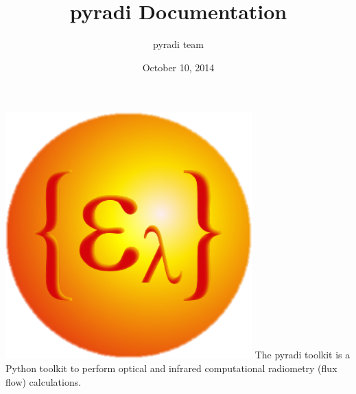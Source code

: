 \documentclass[a4paper,10pt,english]{sphinxmanual}
\title{pyradi Documentation}
\date{October 10, 2014}
\author{pyradi team}
\begin{document}
\maketitle
\tableofcontents
{}\label{index::doc}


{\includegraphics{pyradi.png}\hfill}
\label{index:module-pyradi}
The pyradi toolkit is a Python toolkit to perform optical and infrared 
computational radiometry (flux flow) calculations.
\end{document}
